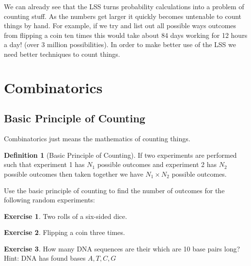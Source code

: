 \documentclass[
]{book}
\theoremstyle{definition}
\newtheorem{definition}{Definition}[chapter]
\theoremstyle{definition}
\theoremstyle{definition}
\newtheorem{exercise}{Exercise}[chapter]
\theoremstyle{definition}
\theoremstyle{remark}
\begin{document}
We can already see that the LSS turns probability calculations into a problem of counting stuff. As the numbers get larger it quickly becomes untenable to count things by hand. For example, if we try and list out all possible ways outcomes from flipping a coin ten times this would take about 84 days working for 12 hours a day! (over 3 million possibilities). In order to make better use of the LSS we need better techniques to count things.

\hypertarget{combinatorics}{%
\section{Combinatorics}\label{combinatorics}}

\hypertarget{basic-principle-of-counting}{%
\subsection{Basic Principle of Counting}\label{basic-principle-of-counting}}

Combinatorics just means the mathematics of counting things.

\begin{definition}[Basic Principle of Counting]
\protect\hypertarget{def:unnamed-chunk-208}{}\label{def:unnamed-chunk-208}If two experiments are performed such that experiment 1 has \(N_1\) possible outcomes and experiment 2 has \(N_2\) possible outcomes then taken together we have \(N_1 \times N_2\) possible outcomes.
\end{definition}

Use the basic principle of counting to find the number of outcomes for the following random experiments:

\begin{exercise}
\protect\hypertarget{exr:unnamed-chunk-209}{}\label{exr:unnamed-chunk-209}Two rolls of a six-sided dice.
\end{exercise}

\begin{exercise}
\protect\hypertarget{exr:unnamed-chunk-210}{}\label{exr:unnamed-chunk-210}Flipping a coin three times.
\end{exercise}

\begin{exercise}
\protect\hypertarget{exr:unnamed-chunk-211}{}\label{exr:unnamed-chunk-211}How many DNA sequences are their which are 10 base pairs long? Hint: DNA has found bases \(A,T,C,G\)
\end{exercise}
\end{document}
